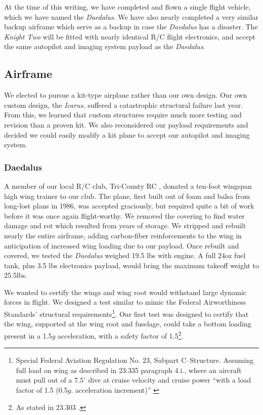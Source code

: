 \documentclass[10pt]{report}
\newcommand{\degrees}[1]
{
\begin{math}
#1^{\circ} 
\end{math}
}
\begin{document}
At the time of this writing, we have completed and flown a single flight vehicle, which we have named the \emph{Daedalus}.
We have also nearly completed a very similar backup airframe which serve as a backup in case the \emph{Daedalus} has a disaster. The \emph{Knight Two} will be fitted with nearly identical R/C flight electronics, and accept the same autopilot and imaging system payload as the \emph{Daedalus}.

\subsection{Airframe}

We elected to pursue a kit-type airplane rather than our own design. 
Our own custom design, the \emph{Icarus}, suffered a catastrophic structural failure last year. From this, we learned that custom structures require much more testing and revision than a proven kit. We also reconsidered our payload requirements and decided we could easily modify a kit plane to accept our autopilot and imaging system.

\subsubsection{Daedalus}

A member of our local R/C club, Tri-County RC \cite{tricountyRC}, donated a ten-foot wingspan high wing trainer to our club. The plane, first built out of foam and balsa from long-lost plans in 1986, was accepted graciously, but required quite a bit of work before it was once again flight-worthy. We removed the covering to find water damage and rot which resulted from years of storage. We stripped and rebuilt nearly the entire airframe, adding carbon-fiber reinforcements to the wing in anticipation of increased wing loading due to our payload. Once rebuilt and covered, we tested the \emph{Daedalus} weighed 19.5 lbs with engine. A full 24oz fuel tank, plus 3.5 lbs electronics payload, would bring the maximum takeoff weight to 25.5lbs.

We wanted to certify the wings and wing root would withstand large dynamic forces in flight. 
We designed a test similar to mimic the 
Federal Airworthiness Standards' structural requirements\footnote{Special Federal Aviation Regulation No. 23, Subpart C--Structure. Assuming full load on wing as described in 23.335 paragraph 4.i., where an aircraft must pull out of a \degrees{7.5} dive at cruise velocity and cruise power ``with a load factor of 1.5 (0.5$g$. acceleration increment)'' \cite{far23}}. Our first test was designed to certify that the wing, supported at the wing root and fuselage, could take a bottom loading present in a 1.5$g$ acceleration, with a safety factor of 1.5\footnote{As stated in 23.303 \cite{far23}.}.
 
\end{document}

